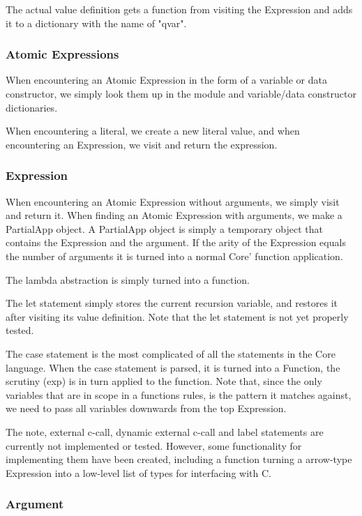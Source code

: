 The actual value definition gets a function from visiting the Expression and adds 
it to a dictionary with the name of "qvar".

\subsubsection{Atomic Expressions}

When encountering an Atomic Expression in the form of a variable or data constructor, 
we simply look them up in the module and variable/data constructor dictionaries.

When encountering a literal, we create a new literal value, and when encountering an
Expression, we visit and return the expression.

\subsubsection{Expression}

When encountering an Atomic Expression without arguments, we simply visit and return
it. When finding an Atomic Expression with arguments, we make a PartialApp object.
A PartialApp object is simply a temporary object that contains the Expression and the
argument. If the arity of the Expression equals the number of arguments it is turned
into a normal Core' function application.

The lambda abstraction is simply turned into a function.

The let statement simply stores the current recursion variable, and restores it after
visiting its value definition. Note that the let statement is not yet properly tested.

The case statement is the most complicated of all the statements in the Core language.
When the case statement is parsed, it is turned into a Function, the scrutiny (exp) 
is in turn applied to the function. Note that, since the only variables that are in
scope in a functions rules, is the pattern it matches against, we need to pass all 
variables downwards from the top Expression.

The note, external c-call, dynamic external c-call and label statements are currently
not implemented or tested. However, some functionality for implementing them have been
created, including a function turning a arrow-type Expression into a low-level list
of types for interfacing with C.

\subsubsection{Argument}

